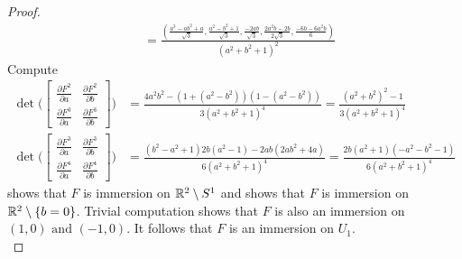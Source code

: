 \documentclass{report}
\begin{document}
\begin{proof}
\begin{align*}
  &=\frac{( \frac{a^3-ab^2+a}{\sqrt{3} }, \frac{a^2-b^2+1}{\sqrt{3} },\frac{-2ab}{\sqrt{3} },\frac{2a^2b-2b}{2\sqrt{3} }, \frac{-6b-6a^2b}{6})}{(a^2+b^2+1)^2}
\end{align*} 
Compute
\begin{align}
\label{mi4}
\operatorname{det}\Big(\begin{bmatrix}
  \frac{\partial F^2}{\partial a} & \frac{\partial F^2}{\partial b}\\
  \frac{\partial F^3}{\partial a} & \frac{\partial F^3}{\partial b}
\end{bmatrix} \Big)&= \frac{4a^2b^2- (1+(a^2-b^2))(1-(a^2-b^2))}{3(a^2+b^2+1)^4}= \frac{(a^2+b^2)^2-1}{3 (a^2+b^2+1)^4}\\
 \label{mi5}  \operatorname{det}\Big(
\begin{bmatrix} 
  \frac{\partial F^3}{\partial a} & \frac{\partial  F^3}{\partial b}\\
  \frac{\partial F^4}{\partial a} & \frac{\partial F^4}{\partial b}
\end{bmatrix} \Big)&=\frac{(b^2-a^2+1)2b(a^2-1)-2ab(2ab^2+4a)}{6(a^2+b^2+1)^4}= \frac{2b(a^2+1)(-a^2-b^2-1)}{6(a^2+b^2+1)^4}
\end{align}
 shows that $F$ is immersion on  $\mathbb{R}^2 \setminus S^1$ and   shows that $F$ is immersion on $\mathbb{R}^2 \setminus \{ b=0 \}$. Trivial computation shows that $F$ is also an immersion on  $(1,0)\text{ and }(-1,0)$. It follows that $F$ is an immersion on  $U_1$.  \\



\end{proof}
\end{document}
